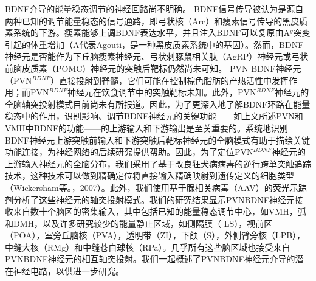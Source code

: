 BDNF介导的能量稳态调节的神经回路尚不明确。 BDNF信号传导被认为是源自两种已知的调节能量稳态的信号通路\citep{waterson2015neuronal, krashes2016melanocortin}，即弓状核（Arc）\citep{xu2003brain}和瘦素信号传导\citep{liao2012dendritically}的黑皮质素系统的下游。瘦素能够上调BDNF表达水平，并且注入BDNF可以复原由A$^{y}$突变引起的体重增加（A代表Agouti，是一种黑皮质素系统中的基因）。然而，BDNF神经元是否能作为下丘脑瘦素神经元、弓状刺豚鼠相关肽（AgRP）神经元或弓状前脑皮质素（POMC）神经元的突触后靶标仍然尚未可知。 PVN BDNF神经元（PVN$^{BDNF}$）直接投射到脊髓，它们可能在控制棕色脂肪的产热活性中发挥作用；而PVN$^{BDNF}$神经元在饮食调节中的突触靶标未知\citep{an2015discrete}。此外，PVN$^{BDNF}$神经元的全脑轴突投射模式目前尚未有所报道。因此，为了更深入地了解BDNF环路在能量稳态中的作用，识别影响、调节BDNF神经元的关键功能——如上文所述PVN和VMH中BDNF的功能——的上游输入和下游输出是至关重要的。系统地识别BDNF神经元上游突触前输入和下游突触后靶标神经元的全脑模式有助于描绘关键功能连接，为神经网络的后续研究提供帮助。因此，为了定位PVN$^{BDNF}$神经元的上游输入神经元的全脑分布，我们采用了基于改良狂犬病病毒的逆行跨单突触追踪技术，这种技术可以做到精确定位将直接输入精确映射到遗传定义的细胞类型（Wickersham等。，2007）。此外，我们使用基于腺相关病毒（AAV）的荧光示踪剂分析了这些神经元的轴突投射模式。我们的研究结果显示PVNBDNF神经元接收来自数十个脑区的密集输入，其中包括已知的能量稳态调节中心，如VMH，弧和DMH，以及许多研究较少的能量静止区域，如侧隔膜（ LS），视前区（POA），室旁丘脑核（PVA），透明带（ZI），下颌（S），外侧臂旁核（LPB），中缝大核（RMg）和中缝苍白球核（RPa）。几乎所有这些脑区域也接受来自PVNBDNF神经元的相互轴突投射。我们一起概述了PVNBDNF神经元介导的潜在神经电路，以供进一步研究。